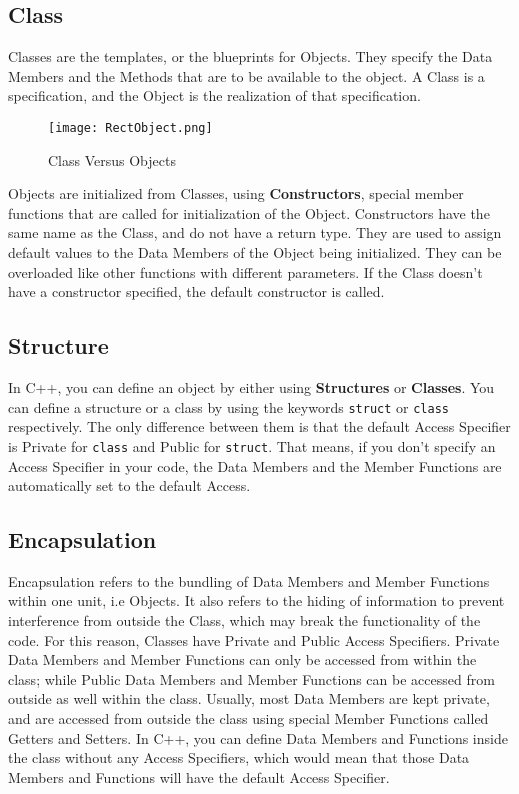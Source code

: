 \documentclass[11pt,fleqn]{book} %
\begin{document}
\subsection{Class}

Classes are the templates, or the blueprints for Objects. They specify the Data Members and the Methods that are to be available to the object. A Class is a specification, and the Object is the realization of that specification.

\begin{figure}[ht]
    \centering
    \texttt{[image: RectObject.png]}
    \caption{Class Versus Objects}
    \label{fig:my_label}
\end{figure}

\noindent Objects are initialized from Classes, using \textbf{Constructors}, special member functions that are called for initialization of the Object. Constructors have the same name as the Class, and do not have a return type. They are used to assign default values to the Data Members of the Object being initialized. They can be overloaded like other functions with different parameters. If the Class doesn't have a constructor specified, the default constructor is called.

\subsection{Structure}

In C++, you can define an object by either using \textbf{Structures} or \textbf{Classes}. You can define a structure or a class by using the keywords \texttt{struct} or \texttt{class} respectively. The only difference between them is that the default Access Specifier is Private for \texttt{class} and Public for \texttt{struct}. That means, if you don't specify an Access Specifier in your code, the Data Members and the Member Functions are automatically set to the default Access. 

\subsection{Encapsulation}

Encapsulation refers to the bundling of Data Members and Member Functions within one unit, i.e Objects. It also refers to the hiding of information to prevent interference from outside the Class, which may break the functionality of the code. For this reason, Classes have Private and Public Access Specifiers. Private Data Members and Member Functions can only be accessed from within the class; while Public Data Members and Member Functions can be accessed from outside as well within the class. Usually, most Data Members are kept private, and are accessed from outside the class using special Member Functions called Getters and Setters. In C++, you can define Data Members and Functions inside the class without any Access Specifiers, which would mean that those Data Members and Functions will have the default Access Specifier.
\end{document}
